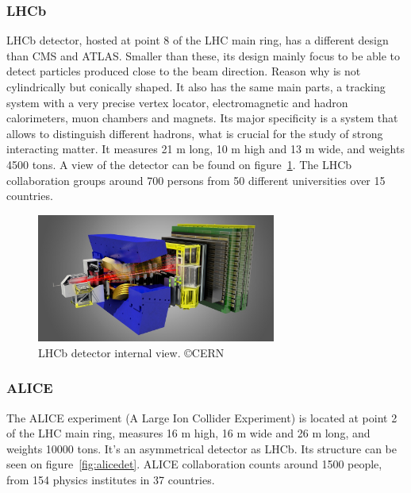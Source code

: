 \subsubsection{LHCb}
\label{sec:lhcb}

LHCb detector, hosted at point 8 of the LHC main ring, has a different design than CMS and ATLAS. Smaller than these, its design mainly focus to be able to detect particles produced close to the beam direction. Reason why is not cylindrically but conically shaped. It also has the same main parts, a tracking system with a very precise vertex locator, electromagnetic and hadron calorimeters, muon chambers and magnets. Its major specificity is a system that allows to distinguish different hadrons, what is crucial for the study of strong interacting matter. It measures 21 m long, 10 m high and 13 m wide, and weights 4500 tons. A view of the detector can be found on figure~\ref{fig:lhcbdet}. The LHCb collaboration groups around 700 persons from 50 different universities over 15 countries. 

\begin{figure}[!Hhtbp]
  \begin{center}
    \includegraphics[width=0.7\textwidth]{figs/LHCbDetectorlight1.jpg}
    \caption{LHCb detector internal view. \copyright CERN}
    \label{fig:lhcbdet}
  \end{center}
\end{figure}

\subsubsection{ALICE}
\label{sec:alice}

The ALICE experiment (A Large Ion Collider Experiment) is located at point 2 of the LHC main ring, measures 16 m high, 16 m wide and 26 m long, and weights 10000 tons. It's an asymmetrical detector as LHCb. Its structure can be seen on figure~\ref{fig:alicedet}. ALICE collaboration counts around 1500 people, from 154 physics institutes in 37 countries. 

